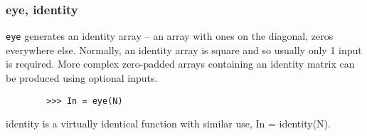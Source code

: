 \documentclass[MASTER.tex]{subfiles}
\begin{document}
\begin{frame}[fragile]
	\frametitle{eye, identity}
	\texttt{eye} generates an identity array – an array with ones on the diagonal, zeros everywhere else. Normally,
	an identity array is square and so usually only 1 input is required. More complex zero-padded arrays
	containing an identity matrix can be produced using optional inputs.
	\begin{framed}
		\begin{verbatim}
		>>> In = eye(N)
		\end{verbatim}
	\end{framed}
	identity is a virtually identical function with similar use, In = identity(N).
\end{frame}
\end{document}
